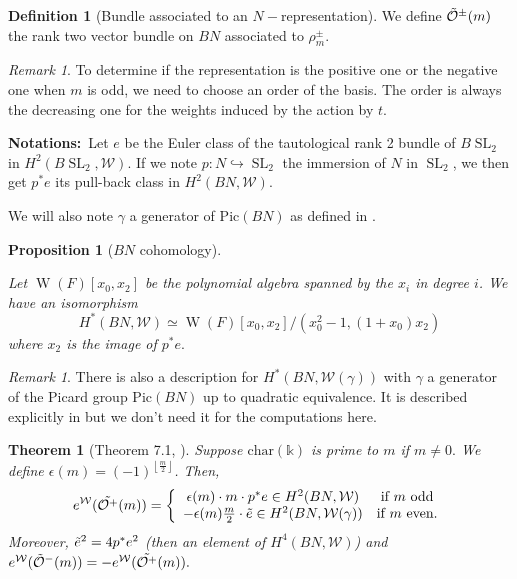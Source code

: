 \documentclass{amsart}
\theoremstyle{plain}%
\newtheorem{tho}[subsubsection]{Theorem}
\newtheorem{prop}[subsubsection]{Proposition}
\theoremstyle{remark}
\newtheorem{rmq}[subsubsection]{Remark}
\theoremstyle{definition}
\newtheorem{deff}[subsubsection]{Definition}
\newcommand{\cO}{\mathcal{O}}
\newcommand{\cW}{\mathcal{W}}
\newcommand{\ek}{\mathbb{k}}
\newcommand{\Witt}{\operatorname{W}}
\newcommand{\Picard}[1]{\mathrm{Pic}\left(#1\right)}
\newcommand{\SL}{\operatorname{SL}}
\newcommand{\si}{\text{if}}
\newcommand{\prtent}[1]{\left\lfloor #1 \right\rfloor}
\begin{document}
\begin{deff}[Bundle associated to an $N-$representation]\label{DEF - fibre assoc N rpz}
We define $\Tilde{\cO}^\pm(m)$ the rank two vector bundle on $BN$ associated to $\rho_m^\pm.$
\end{deff}
\begin{rmq}\label{RMQ - ordre base rpz impair}
To determine if the representation is the positive one or the negative one when $m$ is odd, we need to choose an order of the basis. The order is always the decreasing one for the weights induced by the action by $t.$
\end{rmq}

\noindent\textbf{Notations:}\ Let $e$ be the Euler class of the tautological rank 2 bundle of $B\SL_2$ in $H^2(B\SL_2,\cW)$. If we note $p : N \hookrightarrow \SL_2$ the immersion of $N$ in $\SL_2$, we then get $p^\ast e$ its pull-back class in $H^2(BN,\cW).$ 

We will also note $\gamma$ a generator of $\Picard{BN}$ as defined in \cite[section 5]{Levine_witt-val}.



\begin{prop}[$BN$ cohomology]\label{PROP - cohomologie BN}
\cite[Proposition 5.5]{Levine_witt-val}

Let $\Witt(F)[x_0,x_2]$ be the polynomial algebra spanned by the $x_i$ in degree $i$. We have an isomorphism
\[H^\ast(BN,\cW) \simeq \Witt(F)[x_0,x_2]/(x_0^2-1, (1+x_0)x_2)\]
where $x_2$ is the image of $p^\ast e.$

\end{prop}

\begin{rmq}
There is also a description for $H^\ast(BN,\cW(\gamma))$ with $\gamma$ a generator of the Picard group $\Picard{BN}$ up to quadratic equivalence. It is described explicitly in \cite[Theorem 5.1]{LevineAB24} but we don't need it for the computations here.
\end{rmq}


\begin{tho}[Theorem 7.1, \cite{Levine_witt-val}]\label{THO - classe euler N rpz}
Suppose $\mathrm{char}(\ek)$ is prime to $m$ if $m \neq 0.$ We define $\epsilon(m) =(-1)^{\prtent{\frac{m}{2}}}$. Then,
\[e^\cW(\Tilde{\cO^+}(m)) = \left\{\begin{array}{cc}
    \epsilon(m)\cdot m\cdot p^\ast e \in H^2(BN,\cW) & \si\ m\ \text{odd} \\
    -\epsilon(m)\frac{m}{2}\cdot\Tilde{e} \in H^2(BN,\cW(\gamma))& \si\ m\ \text{even}.
\end{array}\right.\]
Moreover, $\Tilde{e}^2 = 4p^\ast e^2$ (then an element of $H^4(BN,\cW)$) and $e^\cW(\Tilde{\cO}^-(m)) = -e^\cW(\Tilde{\cO^+}(m)).$
\end{tho}
\end{document}
